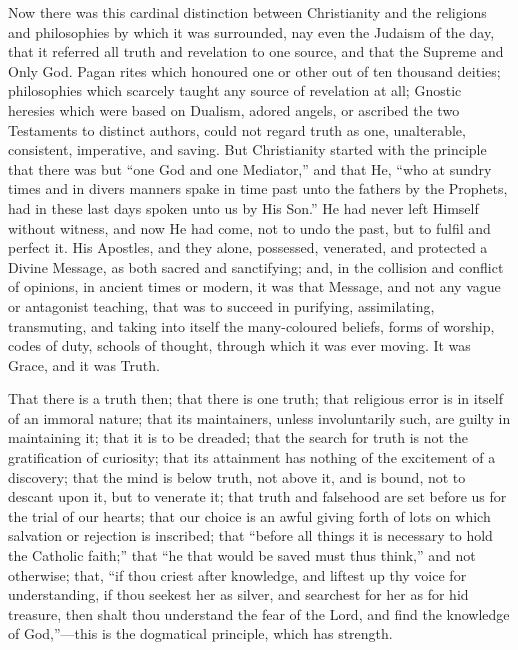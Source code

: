 Now there was this cardinal distinction between
Christianity and the religions and philosophies by which
it was surrounded, nay even the Judaism of the day, that
it referred all truth and revelation to one source, and
that the Supreme and Only God. Pagan rites which honoured
one or other out of ten thousand deities; philosophies
which scarcely taught any source of revelation at all;
Gnostic heresies which were based on Dualism, adored
angels, or ascribed the two Testaments to distinct
authors, could not regard truth as one, unalterable,
consistent, imperative, and saving. But Christianity
started with the principle that there was but ``one
God and one Mediator,'' and that He, ``who at
sundry times and in divers manners spake in time past
unto the fathers by the Prophets, had in these last days
spoken unto us by His Son.'' He had never left
Himself without witness, and now He had come, not to undo
the past, but to fulfil and perfect it. His Apostles, and
they alone, possessed, venerated, and protected a Divine
Message, as both sacred and sanctifying; and, in the
collision and conflict of opinions, in ancient
times or modern, it was that Message, and not any vague
or antagonist teaching, that was to succeed in purifying,
assimilating, transmuting, and taking into itself the
many-coloured beliefs, forms of worship, codes of duty,
schools of thought, through which it was ever moving. It
was Grace, and it was Truth.


That there is a truth then; that there is one truth;
that religious error is in itself of an immoral nature;
that its maintainers, unless involuntarily such, are
guilty in maintaining it; that it is to be dreaded; that
the search for truth is not the gratification of
curiosity; that its attainment has nothing of the
excitement of a discovery; that the mind is below truth,
not above it, and is bound, not to descant upon it, but
to venerate it; that truth and falsehood are set before
us for the trial of our hearts; that our choice is an
awful giving forth of lots on which salvation or
rejection is inscribed; that ``before all things it
is necessary to hold the Catholic faith;'' that
``he that would be saved must thus think,'' and
not otherwise; that, ``if thou criest after
knowledge, and liftest up thy voice for understanding, if
thou seekest her as silver, and searchest for her as for
hid treasure, then shalt thou understand the fear of the
Lord, and find the knowledge of God,''—this is
the dogmatical principle, which has strength.

